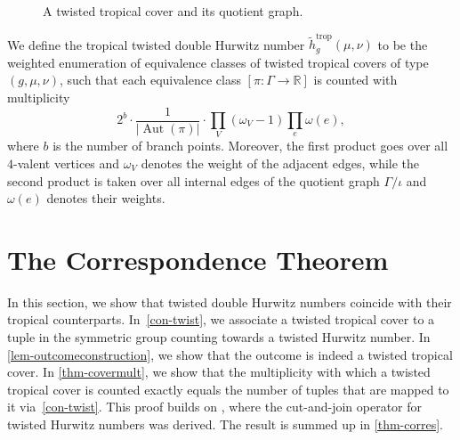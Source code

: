 \documentclass[ALCO,published]{cedram}
\DeclareMathOperator{\Aut}{Aut}
\DeclareMathOperator{\trop}{trop}
\begin{document}
\begin{figure}
\caption{A twisted tropical cover and its quotient graph.}
\label{fig:extwist}
\end{figure}

\begin{defi}
\label{def:twisttrophn}
We define the tropical twisted double Hurwitz 
number $\tilde{h}^{\trop}_g(\mu,\nu)$ to be  the weighted enumeration of equivalence classes of twisted tropical covers of type $(g,\mu,\nu)$, such that each equivalence class $[\pi\colon \Gamma\to\mathbb{R}]$ is counted with multiplicity
\begin{equation*}
    2^{b}\cdot \frac{1}{|\Aut(\pi)|}\cdot\prod_V (\omega_V-1)\prod_e\omega(e),
\end{equation*}
where $b$ is the number of branch points. Moreover, the first product goes over all $4$-valent vertices and $\omega_V$ denotes the weight of the adjacent edges, while the second product is taken over all internal edges of the quotient graph $\Gamma/\iota$ and $\omega(e)$ denotes their weights.
\end{defi}

\section{The Correspondence Theorem}
\label{sec:corr}
In this section, we show that  twisted double Hurwitz numbers coincide with their tropical counterparts.
In~\cref{con-twist}, we associate a twisted tropical cover to a tuple in the symmetric group counting towards a twisted Hurwitz number. In \cref{lem-outcomeconstruction}, we show that the outcome is indeed a twisted tropical cover. In \cref{thm-covermult}, we show that the multiplicity with which a twisted tropical cover is counted exactly equals the number of tuples that are mapped to it via~\cref{con-twist}. This proof builds on \cite[Theorem 2.12]{BF21}, where the cut-and-join operator for twisted Hurwitz numbers was derived.
The result is summed up in \cref{thm-corres}.
\end{document}
